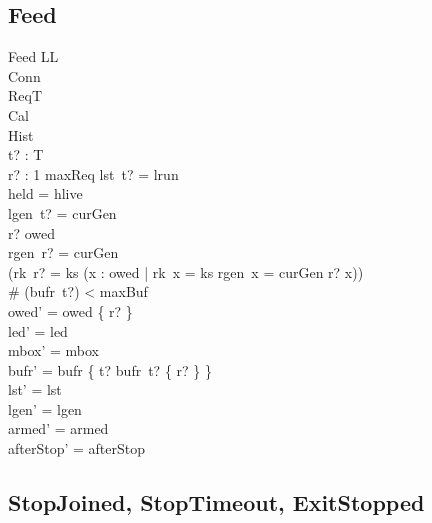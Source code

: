 \documentclass[a4paper,10pt,fleqn]{article}
\begin{document}
\subsection{Feed}

\begin{schema}{Feed}
  \Delta LL \\
  \Xi Conn \\
  \Xi ReqT \\
  \Xi Cal \\
  \Xi Hist \\
  t? : T \\
  r? : 1 \upto maxReq
\where
  lst~t? = lrun \\
  held = hlive \\
  lgen~t? = curGen \\
  r? \in owed \\
  rgen~r? = curGen \\
  (rk~r? = ks \implies
    (\forall x : owed | rk~x = ks \land rgen~x = curGen \spot r? \leq x)) \\
  \# (bufr~t?) < maxBuf \\
  owed' = owed \setminus \{ r? \} \\
  led' = led \\
  mbox' = mbox \\
  bufr' = bufr \oplus \{ t? \mapsto bufr~t? \cup \{ r? \} \} \\
  lst' = lst \\
  lgen' = lgen \\
  armed' = armed \\
  afterStop' = afterStop
\end{schema}

\subsection{StopJoined, StopTimeout, ExitStopped}
\end{document}
